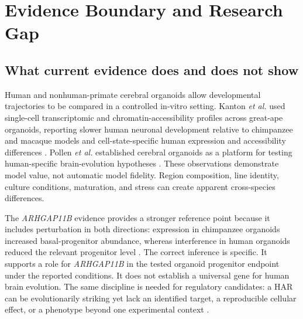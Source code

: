 \documentclass[conference]{IEEEtran}
\begin{document}
\section{Evidence Boundary and Research Gap}

\subsection{What current evidence does and does not show}

Human and nonhuman-primate cerebral organoids allow developmental trajectories to be compared in a controlled in-vitro setting. Kanton \emph{et al.} used single-cell transcriptomic and chromatin-accessibility profiles across great-ape organoids, reporting slower human neuronal development relative to chimpanzee and macaque models and cell-state-specific human expression and accessibility differences \cite{kanton2019}. Pollen \emph{et al.} established cerebral organoids as a platform for testing human-specific brain-evolution hypotheses \cite{pollen2019}. These observations demonstrate model value, not automatic model fidelity. Region composition, line identity, culture conditions, maturation, and stress can create apparent cross-species differences.

The \emph{ARHGAP11B} evidence provides a stronger reference point because it includes perturbation in both directions: expression in chimpanzee organoids increased basal-progenitor abundance, whereas interference in human organoids reduced the relevant progenitor level \cite{fischer2022}. The correct inference is specific. It supports a role for \emph{ARHGAP11B} in the tested organoid progenitor endpoint under the reported conditions. It does not establish a universal gene for human brain evolution. The same discipline is needed for regulatory candidates: a HAR can be evolutionarily striking yet lack an identified target, a reproducible cellular effect, or a phenotype beyond one experimental context \cite{levchenko2018,whalen2023}.
\end{document}
